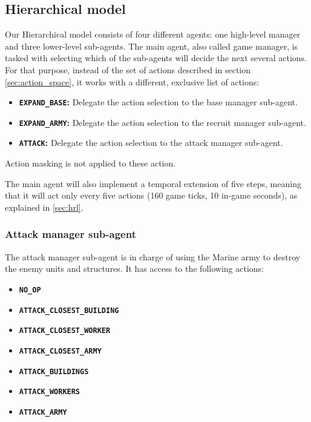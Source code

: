 \subsection{Hierarchical model}

Our Hierarchical model consists of four different agents: one high-level manager and three lower-level sub-agents. The main agent, also called game manager, is tasked with selecting which of the sub-agents will decide the next several actions. For that purpose, instead of the set of actions described in section \ref{sec:action_space}, it works with a different, exclusive list of actions:

\begin{itemize}
    \item \textbf{\texttt{EXPAND\_BASE}:} Delegate the action selection to the base manager sub-agent.
    \item \textbf{\texttt{EXPAND\_ARMY}:} Delegate the action selection to the recruit manager sub-agent.
    \item \textbf{\texttt{ATTACK}:} Delegate the action selection to the attack manager sub-agent.
\end{itemize}

Action masking is not applied to these action.

The main agent will also implement a temporal extension of five steps, meaning that it will act only every five actions (160 game ticks, 10 in-game seconds), as explained in \ref{sec:hrl}.

\subsubsection*{Attack manager sub-agent}

The attack manager sub-agent is in charge of using the Marine army to destroy the enemy units and structures. It has access to the following actions:

\begin{multicols}{2}
\begin{itemize}
    \item \textbf{\texttt{NO\_OP}}
    \item \textbf{\texttt{ATTACK\_CLOSEST\_BUILDING}}
    \item \textbf{\texttt{ATTACK\_CLOSEST\_WORKER}}
    \item \textbf{\texttt{ATTACK\_CLOSEST\_ARMY}}
    \item \textbf{\texttt{ATTACK\_BUILDINGS}}
    \item \textbf{\texttt{ATTACK\_WORKERS}}
    \item \textbf{\texttt{ATTACK\_ARMY}}
\end{itemize}
\end{multicols}

